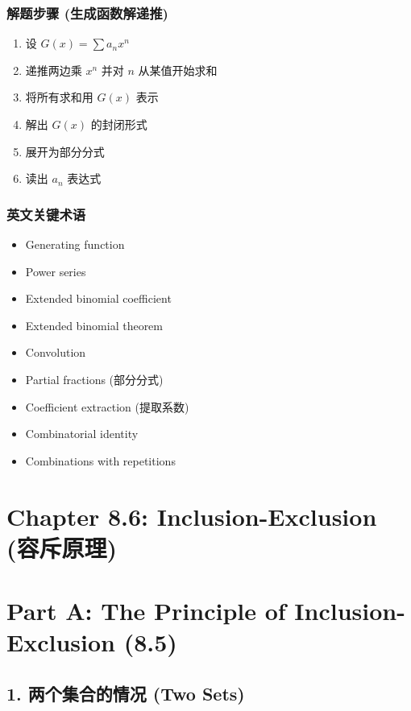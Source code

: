 \documentclass[10pt,a4paper,openany]{ctexbook}
\theoremstyle{definition}
\theoremstyle{remark}
\begin{document}
\subsubsection{解题步骤 (生成函数解递推)}

\begin{enumerate}
\item 设 $G(x) = \sum a_n x^n$
\item 递推两边乘 $x^n$ 并对 $n$ 从某值开始求和
\item 将所有求和用 $G(x)$ 表示
\item 解出 $G(x)$ 的封闭形式
\item 展开为部分分式
\item 读出 $a_n$ 表达式

\end{enumerate}

\subsubsection{英文关键术语}

\begin{itemize}
\item Generating function
\item Power series
\item Extended binomial coefficient
\item Extended binomial theorem
\item Convolution
\item Partial fractions (部分分式)
\item Coefficient extraction (提取系数)
\item Combinatorial identity
\item Combinations with repetitions

\end{itemize}


\section{Chapter 8.6: Inclusion-Exclusion (容斥原理)}

\vspace{-2pt}

\section{Part A: The Principle of Inclusion-Exclusion (8.5)}

\subsection{1. 两个集合的情况 (Two Sets)}
\end{document}
